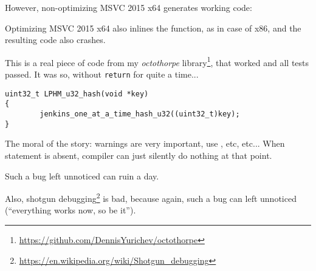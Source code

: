 

However, non-optimizing MSVC 2015 x64 generates working code:



Optimizing MSVC 2015 x64 also inlines the function, as in case of x86, and the resulting code also crashes.

\myhrule{}

This is a real piece of code from my \emph{octothorpe} library\footnote{\url{https://github.com/DennisYurichev/octothorpe}}, that worked and all tests passed.
It was so, without \verb|return| for quite a time...

\begin{lstlisting}
uint32_t LPHM_u32_hash(void *key)
{
        jenkins_one_at_a_time_hash_u32((uint32_t)key);
}
\end{lstlisting}

\myhrule{}

The moral of the story: warnings are very important, use , etc, etc...
When  statement is absent, compiler can just silently do nothing at that point.

Such a bug left unnoticed can ruin a day.

Also, shotgun debugging\footnote{\url{https://en.wikipedia.org/wiki/Shotgun_debugging}}
is bad, because again, such a bug can left unnoticed (``everything works now, so be it'').

